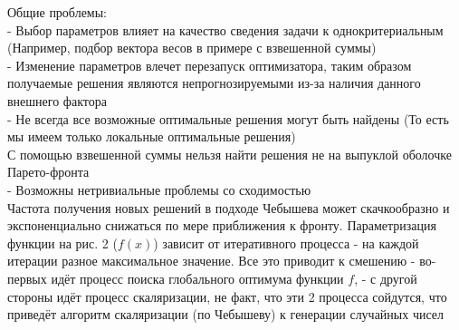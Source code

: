 Общие проблемы:\\
- Выбор параметров влияет на качество сведения задачи к однокритериальным (Например, подбор вектора весов в примере с взвешенной суммы)\\
- Изменение параметров влечет перезапуск оптимизатора, таким образом получаемые решения являются непрогнозируемыми из-за наличия данного внешнего фактора\\
- Не всегда все возможные оптимальные решения могут быть найдены (То есть мы имеем только локальные оптимальные решения)\\
С помощью взвешенной суммы нельзя найти решения не на выпуклой оболочке Парето-фронта\\
- Возможны нетривиальные проблемы со сходимостью\\
Частота получения новых решений в подходе Чебышева может скачкообразно и экспоненциально снижаться по мере приближения к фронту. Параметризация функции на рис. 2 ($f(x)$) зависит от итеративного процесса - на каждой итерации разное максимальное значение. Все это приводит к смешению - во-первых идёт процесс поиска глобального оптимума функции $f$, - с другой стороны идёт процесс скаляризации, не факт, что эти 2 процесса сойдутся, что приведёт алгоритм скаляризации (по Чебышеву) к генерации случайных чисел
